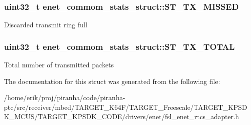 \subsubsection[{\texorpdfstring{S\+T\+\_\+\+T\+X\+\_\+\+M\+I\+S\+S\+ED}{ST_TX_MISSED}}]{\setlength{\rightskip}{0pt plus 5cm}uint32\+\_\+t enet\+\_\+commom\+\_\+stats\+\_\+struct\+::\+S\+T\+\_\+\+T\+X\+\_\+\+M\+I\+S\+S\+ED}\hypertarget{structenet__commom__stats__struct_a2eeaada0558d2fcbcf8e76230213ec70}{}\label{structenet__commom__stats__struct_a2eeaada0558d2fcbcf8e76230213ec70}
Discarded transmit ring full 
\subsubsection[{\texorpdfstring{S\+T\+\_\+\+T\+X\+\_\+\+T\+O\+T\+AL}{ST_TX_TOTAL}}]{\setlength{\rightskip}{0pt plus 5cm}uint32\+\_\+t enet\+\_\+commom\+\_\+stats\+\_\+struct\+::\+S\+T\+\_\+\+T\+X\+\_\+\+T\+O\+T\+AL}\hypertarget{structenet__commom__stats__struct_a65c77b4c4e84dcb2eb6fc7ded173cb54}{}\label{structenet__commom__stats__struct_a65c77b4c4e84dcb2eb6fc7ded173cb54}
Total number of transmitted packets 

The documentation for this struct was generated from the following file\+:\begin{DoxyCompactItemize}
\item 
/home/erik/proj/piranha/code/piranha-\/ptc/src/receiver/mbed/\+T\+A\+R\+G\+E\+T\+\_\+\+K64\+F/\+T\+A\+R\+G\+E\+T\+\_\+\+Freescale/\+T\+A\+R\+G\+E\+T\+\_\+\+K\+P\+S\+D\+K\+\_\+\+M\+C\+U\+S/\+T\+A\+R\+G\+E\+T\+\_\+\+K\+P\+S\+D\+K\+\_\+\+C\+O\+D\+E/drivers/enet/fsl\+\_\+enet\+\_\+rtcs\+\_\+adapter.\+h\end{DoxyCompactItemize}
